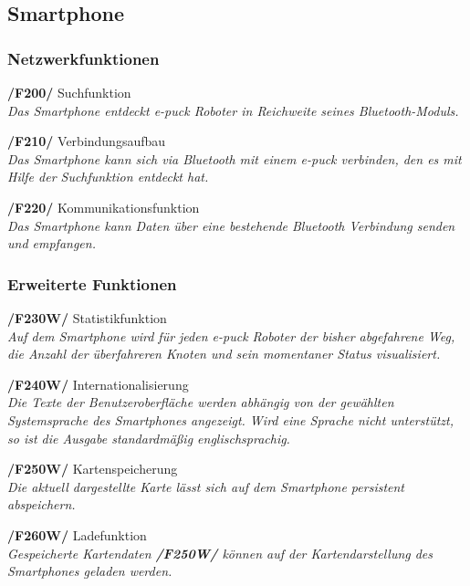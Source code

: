\documentclass[10pt,a4paper]{article}
\begin{document}
		\subsection{Smartphone}
			\subsubsection{Netzwerkfunktionen}
				\begin{list}{}{\leftmargin=1cm}
					\item[\textbf{/F200/}] Suchfunktion
						\\ \textsl{Das Smartphone entdeckt e-puck Roboter in Reichweite seines Bluetooth-Moduls.}
					\item[\textbf{/F210/}] Verbindungsaufbau
						\\ \textsl{Das Smartphone kann sich via Bluetooth mit einem e-puck verbinden, den es mit Hilfe
						der Suchfunktion entdeckt hat.}				
					\item[\textbf{/F220/}] Kommunikationsfunktion
						\\ \textsl{Das Smartphone kann Daten über eine bestehende Bluetooth Verbindung senden und empfangen.}
				\end{list}	
			\subsubsection{Erweiterte Funktionen}
				\begin{list}{}{\leftmargin=1cm}
					\item[\textbf{/F230W/}] Statistikfunktion	
						\\ \textsl{Auf dem Smartphone wird für jeden e-puck Roboter der bisher abgefahrene Weg, die Anzahl der überfahreren
							Knoten und sein momentaner Status visualisiert.}							
					\item[\textbf{/F240W/}] Internationalisierung	
						\\ \textsl{Die Texte der Benutzeroberfläche werden abhängig von der gewählten Systemsprache des Smartphones
							angezeigt. Wird eine Sprache nicht unterstützt, so ist die Ausgabe standardmäßig englischsprachig.}
					\item[\textbf{/F250W/}] Kartenspeicherung	
						\\ \textsl{Die aktuell dargestellte Karte lässt sich auf dem Smartphone persistent abspeichern.}
					\item[\textbf{/F260W/}] Ladefunktion	
						\\ \textsl{Gespeicherte Kartendaten \textbf{/F250W/} können auf der Kartendarstellung des Smartphones geladen werden.}
				\end{list}						
\end{document}
